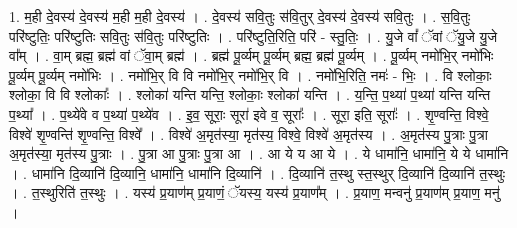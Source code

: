 \documentclass[17pt]{extarticle}
\begin{document}
1. म॒ही दे॒वस्य॑ दे॒वस्य॑ म॒ही म॒ही दे॒वस्य॑ । . दे॒वस्य॑ सवि॒तुः स॑वि॒तुर् दे॒वस्य॑ दे॒वस्य॑ सवि॒तुः । . स॒वि॒तुः परि॑ष्टुतिः॒ परि॑ष्टुतिः सवि॒तुः स॑वि॒तुः परि॑ष्टुतिः । . परि॑ष्टुति॒रिति॒ परि॑ - स्तु॒तिः॒ । . यु॒जे वां᳚ ॅवां ॅयु॒जे यु॒जे वा᳚म् । . वा॒म् ब्रह्म॒ ब्रह्म॑ वां ॅवा॒म् ब्रह्म॑ । . ब्रह्म॑ पू॒र्व्यम् पू॒र्व्यम् ब्रह्म॒ ब्रह्म॑ पू॒र्व्यम् । . पू॒र्व्यम् नमो॑भि॒र् नमो॑भिः पू॒र्व्यम् पू॒र्व्यम् नमो॑भिः । . नमो॑भि॒र् वि वि नमो॑भि॒र् नमो॑भि॒र् वि । . नमो॑भि॒रिति॒ नमः॑ - भिः॒ । . वि श्लोकाः॒ श्लोका॒ वि वि श्लोकाः᳚ । . श्लोका॑ यन्ति यन्ति॒ श्लोकाः॒ श्लोका॑ यन्ति । . य॒न्ति॒ प॒थ्या॑ प॒थ्या॑ यन्ति यन्ति प॒थ्या᳚ । . प॒थ्ये॑वे व प॒थ्या॑ प॒थ्ये॑व । . इ॒व॒ सूराः॒ सूरा॑ इवे व॒ सूराः᳚ । . सूरा॒ इति॒ सूराः᳚ । . शृ॒ण्वन्ति॒ विश्वे॒ विश्वे॑ शृ॒ण्वन्ति॑ शृ॒ण्वन्ति॒ विश्वे᳚ । . विश्वे॑ अ॒मृत॑स्या॒ मृत॑स्य॒ विश्वे॒ विश्वे॑ अ॒मृत॑स्य । . अ॒मृत॑स्य पु॒त्राः पु॒त्रा अ॒मृत॑स्या॒ मृत॑स्य पु॒त्राः । . पु॒त्रा आ पु॒त्राः पु॒त्रा आ । . आ ये य आ ये । . ये धामा॑नि॒ धामा॑नि॒ ये ये धामा॑नि । . धामा॑नि दि॒व्यानि॑ दि॒व्यानि॒ धामा॑नि॒ धामा॑नि दि॒व्यानि॑ । . दि॒व्यानि॑ त॒स्थु स्त॒स्थुर् दि॒व्यानि॑ दि॒व्यानि॑ त॒स्थुः । . त॒स्थुरिति॑ त॒स्थुः । . यस्य॑ प्र॒याण॑म् प्र॒याणं॒ ॅयस्य॒ यस्य॑ प्र॒याण᳚म् । . प्र॒याण॒ मन्वनु॑ प्र॒याण॑म् प्र॒याण॒ मनु॑ । \newline
\end{document}
